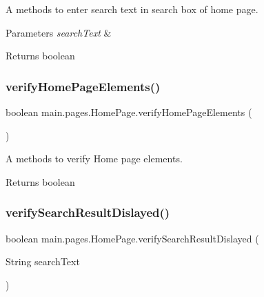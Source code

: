 A methods to enter search text in search box of home page. 
\begin{DoxyParams}{Parameters}
{\em search\+Text} & \\
\hline
\end{DoxyParams}
\begin{DoxyReturn}{Returns}
boolean 
\end{DoxyReturn}
\mbox{\label{classmain_1_1pages_1_1_home_page_ab12db71ec89778964fe831fdbc8f78d2}} 
\subsubsection{\texorpdfstring{verify\+Home\+Page\+Elements()}{verifyHomePageElements()}}
{\footnotesize\ttfamily boolean main.\+pages.\+Home\+Page.\+verify\+Home\+Page\+Elements (\begin{DoxyParamCaption}{ }\end{DoxyParamCaption})}

A methods to verify Home page elements. \begin{DoxyReturn}{Returns}
boolean 
\end{DoxyReturn}
\mbox{\label{classmain_1_1pages_1_1_home_page_a23f149b5230539d36088c9d85ddd6fa7}} 
\subsubsection{\texorpdfstring{verify\+Search\+Result\+Dislayed()}{verifySearchResultDislayed()}}
{\footnotesize\ttfamily boolean main.\+pages.\+Home\+Page.\+verify\+Search\+Result\+Dislayed (\begin{DoxyParamCaption}\item[{String}]{search\+Text }\end{DoxyParamCaption})}

